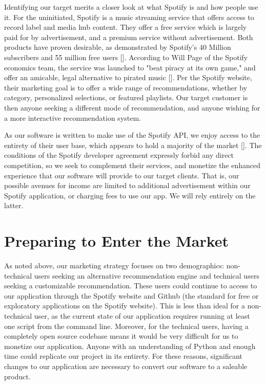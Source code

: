 \documentclass{roffin}
\begin{document}
Identifying our target merits a closer look at what Spotify is and how people use it.  For the uninitiated, Spotify is a music streaming service that offers access to record label and media hub content.  They offer a free service which is largely paid for by advertisement, and a premium service without advertisement.  Both products have proven desirable, as demonstrated by Spotify's 40 Million subscribers and 55 million free users [\cite{digital_trends}].  According to Will Page of the Spotify economics team, the service was launched to "beat piracy at its own game," and offer an amicable, legal alternative to pirated music [\cite{adventures}].  Per the Spotify website, their marketing goal is to offer a wide range of recommendations, whether by category, personalized selections, or featured playlists.  Our target customer is then anyone seeking a different mode of recommendation, and anyone wishing for a more interactive recommendation system.

As our software is written to make use of the Spotify API, we enjoy access to the entirety of their user base, which appears to hold a majority of the market [\cite{digital_trends}].  The conditions of the Spotify developer agreement expressly forbid any direct competition, so we seek to complement their services, and monetize the enhanced experience that our software will provide to our target clients.  That is, our possible avenues for income are limited to additional advertisement within our Spotify application, or charging fees to use our app.  We will rely entirely on the latter.

\section{Preparing to Enter the Market}

As noted above, our marketing strategy focuses on two demographics: non-technical users seeking an alternative recommendation engine and technical users seeking a customizable recommendation.  These users could continue to access to our application through the Spotify website and Github (the standard for free or exploratory applications on the Spotify website).  This is less than ideal for a non-technical user, as the current state of our application requires running at least one script from the command line.  Moreover, for the technical users, having a completely open source codebase means it would be very difficult for us to monetize our application.  Anyone with an understanding of Python and enough time could replicate our project in its entirety.  For these reasons, significant changes to our application are necessary to convert our software to a saleable product.
\end{document}
